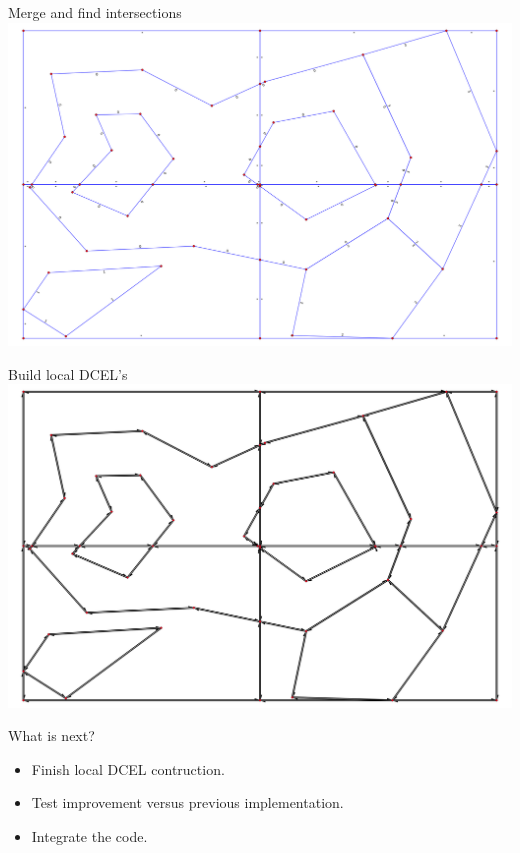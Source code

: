 \documentclass{beamer}
\begin{document}
\begin{frame}{Merge and find intersections}
    \centering 
    \includegraphics[width=0.8\linewidth]{figures/EP05}     
\end{frame}

\begin{frame}{Build local DCEL's}
    \centering 
    \includegraphics[width=0.8\linewidth]{figures/EP06}     
\end{frame}

\begin{frame}{What is next?}
    \begin{itemize}
        \item Finish local DCEL contruction.
        \item Test improvement versus previous implementation.
        \item Integrate the code.
    \end{itemize}
\end{frame}
\end{document}
